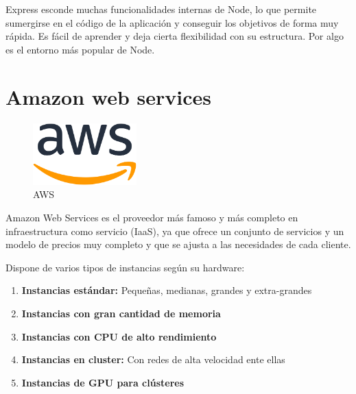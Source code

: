 Express esconde muchas funcionalidades internas de Node, lo que permite sumergirse en el código de la aplicación y conseguir los objetivos de forma muy rápida. Es fácil de aprender y deja cierta flexibilidad con su estructura.
Por algo es el entorno más popular de Node.
\section{Amazon web services}

\begin{figure}[!h]
    \centering
    \includegraphics[width=40mm]{img/despliegue/aws2.png}
    \caption{AWS}
\end{figure}

Amazon Web Services es el proveedor más famoso y más completo en infraestructura como servicio (IaaS), ya que ofrece un conjunto de servicios y un modelo de precios muy completo y que se ajusta a las necesidades de cada cliente.

Dispone de varios tipos de instancias según su hardware:

\begin{enumerate}
    \item \textbf{Instancias estándar: } Pequeñas, medianas, grandes y extra-grandes
    \item \textbf{Instancias con gran cantidad de memoria}
    \item \textbf{Instancias con CPU de alto rendimiento}
    \item \textbf{Instancias en cluster: } Con redes de alta velocidad ente ellas
    \item \textbf{Instancias de GPU para clústeres}
\end{enumerate}

